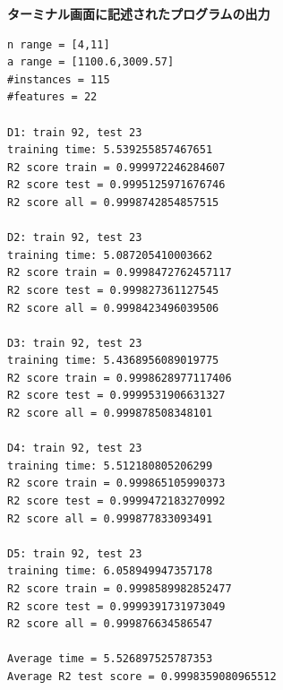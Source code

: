 \documentclass[11pt,titlepage,dvipdfmx,twoside]{jarticle}
\begin{document}
\bigskip

\begin{oframed}
{\bf  ターミナル画面に記述されたプログラムの出力}\\
\begin{verbatim}
n range = [4,11]
a range = [1100.6,3009.57]
#instances = 115
#features = 22

D1: train 92, test 23
training time: 5.539255857467651
R2 score train = 0.999972246284607
R2 score test = 0.9995125971676746
R2 score all = 0.9998742854857515

D2: train 92, test 23
training time: 5.087205410003662
R2 score train = 0.9998472762457117
R2 score test = 0.999827361127545
R2 score all = 0.9998423496039506

D3: train 92, test 23
training time: 5.4368956089019775
R2 score train = 0.9998628977117406
R2 score test = 0.9999531906631327
R2 score all = 0.999878508348101

D4: train 92, test 23
training time: 5.512180805206299
R2 score train = 0.999865105990373
R2 score test = 0.9999472183270992
R2 score all = 0.999877833093491

D5: train 92, test 23
training time: 6.058949947357178
R2 score train = 0.9998589982852477
R2 score test = 0.9999391731973049
R2 score all = 0.999876634586547

Average time = 5.526897525787353
Average R2 test score = 0.9998359080965512
\end{verbatim}
\end{oframed}

\bigskip\bigskip



\end{document}

